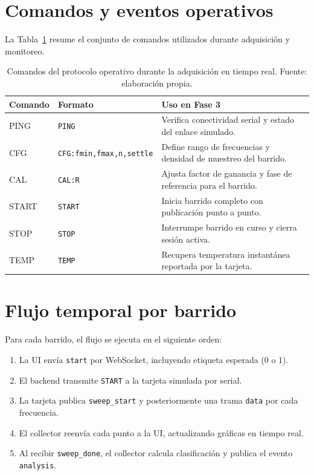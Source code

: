 \documentclass[11pt,a4paper,spanish]{book}
\begin{document}
\section{Comandos y eventos operativos}

La Tabla~\ref{tab:comandos-fase3} resume el conjunto de comandos utilizados durante adquisici\'{o}n y monitoreo.

\begin{table}[ht]
	\centering
	\begin{tabular}{l l p{7.5cm}}
		\hline\hline
		Comando & Formato                         & Uso en Fase 3                                                   \\ [0.5ex]
		\hline
		PING    & \texttt{PING}                   & Verifica conectividad serial y estado del enlace simulado.      \\
		CFG     & \texttt{CFG:fmin,fmax,n,settle} & Define rango de frecuencias y densidad de muestreo del barrido. \\
		CAL     & \texttt{CAL:R}                  & Ajusta factor de ganancia y fase de referencia para el barrido. \\
		START   & \texttt{START}                  & Inicia barrido completo con publicaci\'{o}n punto a punto.      \\
		STOP    & \texttt{STOP}                   & Interrumpe barrido en curso y cierra sesi\'{o}n activa.         \\
		TEMP    & \texttt{TEMP}                   & Recupera temperatura instant\'{a}nea reportada por la tarjeta.  \\
		\hline
	\end{tabular}
	\caption[Comandos usados en adquisici\'{o}n]{Comandos del protocolo operativo durante la adquisici\'{o}n en tiempo real. Fuente: elaboraci\'{o}n propia.}
	\label{tab:comandos-fase3}
\end{table}

\section{Flujo temporal por barrido}

Para cada barrido, el flujo se ejecuta en el siguiente orden:

\begin{enumerate}
	\item La UI env\'{i}a \texttt{start} por WebSocket, incluyendo etiqueta esperada (0 o 1).
	\item El backend transmite \texttt{START} a la tarjeta simulada por serial.
	\item La tarjeta publica \texttt{sweep\_start} y posteriormente una trama \texttt{data} por cada frecuencia.
	\item El collector reenv\'{i}a cada punto a la UI, actualizando gr\'{a}ficas en tiempo real.
	\item Al recibir \texttt{sweep\_done}, el collector calcula clasificaci\'{o}n y publica el evento \texttt{analysis}.
\end{enumerate}
\end{document}
